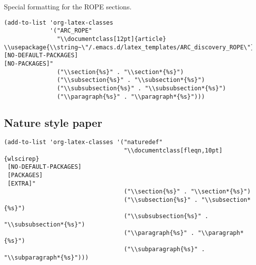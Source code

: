 \documentclass[12pt]{article}
\begin{document}
Special formatting for the ROPE sections.

\begin{verbatim}
(add-to-list 'org-latex-classes
             '("ARC_ROPE"
               "\\documentclass[12pt]{article}
\\usepackage{\\string~\"/.emacs.d/latex_templates/ARC_discovery_ROPE\"}
[NO-DEFAULT-PACKAGES]
[NO-PACKAGES]"
               ("\\section{%s}" . "\\section*{%s}")
               ("\\subsection{%s}" . "\\subsection*{%s}")
               ("\\subsubsection{%s}" . "\\subsubsection*{%s}")
               ("\\paragraph{%s}" . "\\paragraph*{%s}")))
\end{verbatim}



\subsection{Nature style paper}
\label{sec:orgdaa7d04}

\begin{verbatim}
(add-to-list 'org-latex-classes '("naturedef"
                                  "\\documentclass[fleqn,10pt]{wlscirep}
 [NO-DEFAULT-PACKAGES]
 [PACKAGES]
 [EXTRA]"
                                  ("\\section{%s}" . "\\section*{%s}")
                                  ("\\subsection{%s}" . "\\subsection*{%s}")
                                  ("\\subsubsection{%s}" . "\\subsubsection*{%s}")
                                  ("\\paragraph{%s}" . "\\paragraph*{%s}")
                                  ("\\subparagraph{%s}" . "\\subparagraph*{%s}")))
\end{verbatim}
\end{document}
